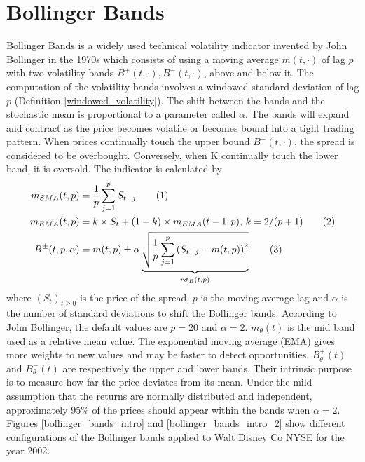 \documentclass[11pt,a4,twosided,singlespacing,titlepagenumber=on]{scrreprt}
\numberwithin{equation}{chapter} %
\theoremstyle{remark}
\newcommand\numberthis{\addtocounter{equation}{1}\tag{\theequation}}
\begin{document}
\section{Bollinger Bands}
\label{sec:bollinger_bands}
Bollinger Bands is a widely used technical volatility indicator invented by John Bollinger in the 1970s which consists of using a moving average $m(t,\cdot)$ of lag $p$ with two volatility bands $B^+(t,\cdot), B^-(t,\cdot)$, above and below it. The computation of the volatility bands involves a windowed standard deviation of lag $p$ (Definition \ref{windowed_volatility}). The shift between the bands and the stochastic mean is proportional to a parameter called $\alpha$. The bands will expand and contract as the price becomes volatile or becomes bound into a tight trading pattern. When prices continually touch the upper bound $B^+(t,\cdot)$, the spread is considered to be overbought. Conversely, when K continually touch the lower band, it is oversold. The indicator is calculated by
\begin{align*}
m_{SMA}(t,p) &= \frac{1}{p}\sum_{j=1}^p S_{t-j} \numberthis \\
m_{EMA}(t,p) &= k \times S_t + (1-k) \times m_{EMA}(t-1,p) \text{, } k = 2/(p+1)\numberthis \\
B^\pm(t,p,\alpha) &= m(t,p) \pm \alpha \underbrace{\sqrt{\frac{1}{p} \sum_{j=1}^p \left(S_{t-j} - m(t,p) \right)^2}}_{r\sigma_B(t,p)} \numberthis \label{bolls_computations}
\end{align*}
where $(S_t)_{t \geq 0}$ is the price of the spread, $p$ is the moving average lag and $\alpha$ is the number of standard deviations to shift the Bollinger bands. According to John Bollinger, the default values are $p = 20$ and $\alpha = 2$. $m_\theta(t)$ is the mid band used as a relative mean value. The exponential moving average (EMA) gives more weights to new values and may be faster to detect opportunities. $B^+_\theta(t)$ and $B^-_\theta(t)$ are respectively the upper and lower bands. Their intrinsic purpose is to measure how far the price deviates from its mean. Under the mild assumption that the returns are normally distributed and independent, approximately 95\% of the prices should appear within the bands when $\alpha = 2$. Figures \ref{bollinger_bands_intro} and \ref{bollinger_bands_intro_2} show different configurations of the Bollinger bands applied to Walt Disney Co NYSE for the year 2002.
\end{document}
